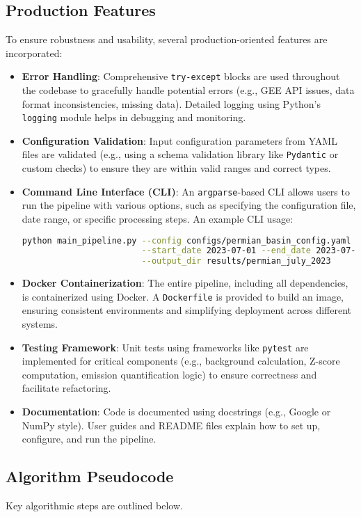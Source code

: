 \documentclass[12pt,a4paper]{article}
\begin{document}
\subsection{Production Features}
To ensure robustness and usability, several production-oriented features are incorporated:
\begin{itemize}
    \item \textbf{Error Handling}: Comprehensive \texttt{try-except} blocks are used throughout the codebase to gracefully handle potential errors (e.g., GEE API issues, data format inconsistencies, missing data). Detailed logging using Python's \texttt{logging} module helps in debugging and monitoring.
    \item \textbf{Configuration Validation}: Input configuration parameters from YAML files are validated (e.g., using a schema validation library like \texttt{Pydantic} or custom checks) to ensure they are within valid ranges and correct types.
    \item \textbf{Command Line Interface (CLI)}: An \texttt{argparse}-based CLI allows users to run the pipeline with various options, such as specifying the configuration file, date range, or specific processing steps.
    An example CLI usage:
\begin{lstlisting}[language=bash, caption=Example CLI command, label=lst:cli_example]
python main_pipeline.py --config configs/permian_basin_config.yaml \
                        --start_date 2023-07-01 --end_date 2023-07-05 \
                        --output_dir results/permian_july_2023
\end{lstlisting}
    \item \textbf{Docker Containerization}: The entire pipeline, including all dependencies, is containerized using Docker. A \texttt{Dockerfile} is provided to build an image, ensuring consistent environments and simplifying deployment across different systems.
    \item \textbf{Testing Framework}: Unit tests using frameworks like \texttt{pytest} are implemented for critical components (e.g., background calculation, Z-score computation, emission quantification logic) to ensure correctness and facilitate refactoring.
    \item \textbf{Documentation}: Code is documented using docstrings (e.g., Google or NumPy style). User guides and README files explain how to set up, configure, and run the pipeline.
\end{itemize}

\subsection{Algorithm Pseudocode}
Key algorithmic steps are outlined below.
\end{document}
